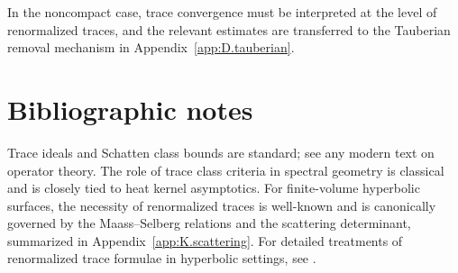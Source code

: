 \begin{remark}
\label{rem:L.tauberian.bridge}
In the noncompact case, trace convergence must be interpreted at the level of renormalized traces, and the relevant
estimates are transferred to the Tauberian removal mechanism in Appendix~\ref{app:D.tauberian}.
\end{remark}

\section*{Bibliographic notes}

Trace ideals and Schatten class bounds are standard; see any modern text on operator theory.
The role of trace class criteria in spectral geometry is classical and is closely tied to heat kernel asymptotics.
For finite-volume hyperbolic surfaces, the necessity of renormalized traces is well-known and is canonically governed
by the Maass--Selberg relations and the scattering determinant, summarized in Appendix~\ref{app:K.scattering}.
For detailed treatments of renormalized trace formulae in hyperbolic settings, see \cite{Hejhal1983,Iwaniec2002}.

